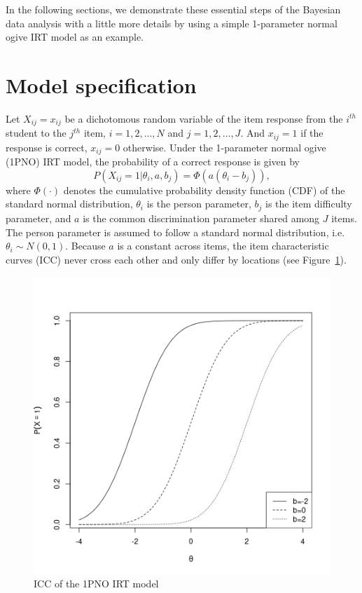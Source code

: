 \documentclass[floatsintext, man]{apa7}
\begin{document}
In the following sections, we demonstrate these essential steps of the Bayesian
data analysis with a little more details by using a simple 1-parameter normal
ogive IRT model as an example.

\section{Model specification} 
Let $X_{ij} = x_{ij}$ be a dichotomous random variable of the item response from
the $i^{th}$ student to the $j^{th}$ item, $i = 1, 2, \dots, N$ and $j = 1, 2,
\dots, J$. And $x_{ij} = 1$ if the response is correct, $x_{ij} = 0$ otherwise.
Under the 1-parameter normal ogive (1PNO) IRT model, the probability of a
correct response is given by 
\begin{equation}
\label{eq:1PNO_with_a}
  P(X_{ij} = 1 | \theta_i, a, b_j) = \Phi(a(\theta_i - b_j)),
\end{equation}
where $\Phi(\cdot)$ denotes the cumulative probability density function (CDF) of
the standard normal distribution, $\theta_i$ is the person parameter, $b_j$ is
the item difficulty parameter, and $a$ is the common discrimination parameter
shared among $J$ items. The person parameter is assumed to follow a standard
normal distribution, i.e. $\theta_i \sim N(0,1)$. Because $a$ is a constant
across items, the item characteristic curves (ICC) never cross each other and
only differ by locations (see Figure~\ref{fig:ICC}).
\begin{figure}[t]
\centering
  \includegraphics[scale=0.5]{Fig/ICC.png}
  \caption{ICC of the 1PNO IRT model}
  \label{fig:ICC}
\end{figure}
\end{document}
